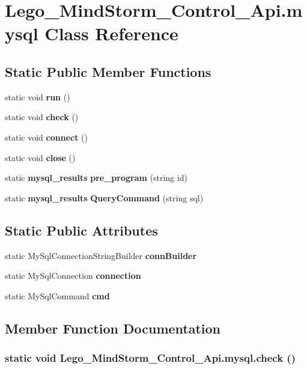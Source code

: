 \section{Lego\_\-MindStorm\_\-Control\_\-Api.mysql Class Reference}
\label{class_lego___mind_storm___control___api_1_1mysql}
\subsection*{Static Public Member Functions}
\begin{CompactItemize}
\item 
static void {\bf run} ()
\item 
static void {\bf check} ()
\item 
static void {\bf connect} ()
\item 
static void {\bf close} ()
\item 
static {\bf mysql\_\-results} {\bf pre\_\-program} (string id)
\item 
static {\bf mysql\_\-results} {\bf QueryCommand} (string sql)
\end{CompactItemize}
\subsection*{Static Public Attributes}
\begin{CompactItemize}
\item 
static MySqlConnectionStringBuilder {\bf connBuilder}
\item 
static MySqlConnection {\bf connection}
\item 
static MySqlCommand {\bf cmd}
\end{CompactItemize}


\subsection{Member Function Documentation}
\subsubsection[{check}]{\setlength{\rightskip}{0pt plus 5cm}static void Lego\_\-MindStorm\_\-Control\_\-Api.mysql.check ()\hspace{0.3cm}{\tt  [static]}}\label{class_lego___mind_storm___control___api_1_1mysql_c8132164866e3aff6dd941913f7ea0de}


